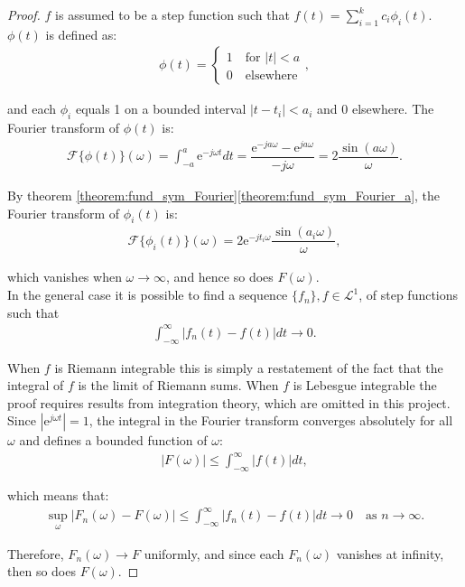 \begin{proof}
$f$ is assumed to be a step function such that $f(t) = \sum_{i=1}^k c_i \phi_i(t)$. $\phi(t)$ is defined as:
\begin{align*}
\phi(t) =
	\begin{cases}
		1 \quad \text{for } |t| < a \\
		0 \quad \text{elsewhere}
	\end{cases},
\end{align*}

and each $\phi_i$ equals 1 on a bounded interval $|t - t_i| < a_i$ and 0 elsewhere. The Fourier transform of $\phi(t)$ is:
\begin{align*}
\mathcal{F}\{\phi(t)\}(\omega) = \int_{-a}^a \text{e}^{-j\omega t} dt = \dfrac{\text{e}^{-ja\omega} - \text{e}^{ja\omega}}{-j\omega} = 2\dfrac{\sin(a\omega)}{\omega}.
\end{align*}

By theorem \ref{theorem:fund_sym_Fourier}\ref{theorem:fund_sym_Fourier_a}, the Fourier transform of $\phi_i(t)$ is:
\begin{align*}
\mathcal{F}\{\phi_i(t)\}(\omega) = 2 \text{e}^{-jt_i\omega} \dfrac{\sin(a_i\omega)}{\omega},
\end{align*}

which vanishes when $\omega \to \infty$, and hence so does $F(\omega)$.
\\
In the general case it is possible to find a sequence $\{f_n\}, f \in \mathcal{L}^1$, of step functions such that
\begin{align*}
\int_{-\infty}^\infty |f_n(t) - f(t)| dt \to 0.
\end{align*}

When $f$ is Riemann integrable this is simply a restatement of the fact that the integral of $f$ is the limit of Riemann sums. When $f$ is Lebesgue integrable the proof requires results from integration theory, which are omitted in this project. Since $|\text{e}^{j\omega t}| = 1$, the integral in the Fourier transform converges absolutely for all $\omega$ and defines a bounded function of $\omega$:
\begin{align*}
|F(\omega)| \leq \int_{-\infty}^\infty |f(t)| dt,
\end{align*}

which means that:
\begin{align*}
\sup_{\omega} |F_n(\omega) - F(\omega)| \leq \int_{-\infty}^\infty |f_n(t) - f(t)| dt \to 0 \quad \text{as } n \to \infty.
\end{align*}

Therefore, $F_n(\omega) \to F$ uniformly, and since each $F_n(\omega)$ vanishes at infinity, then so does $F(\omega)$.
\end{proof}

